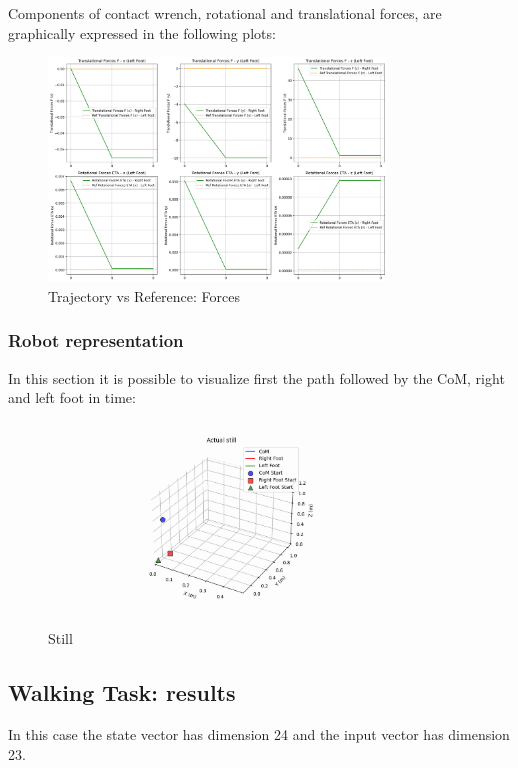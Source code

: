 \documentclass[main.tex]{subfiles}
\begin{document}
Components of contact wrench, rotational and translational forces, are graphically expressed in the following plots:
\begin{figure}[htbp]
    \centering
    \includegraphics[width=0.8\textwidth]{figures/contact_forces_still.png}
    \caption{Trajectory vs Reference: Forces}
    \label{fig:contact_forces_still}
\end{figure}

\newpage
\subsubsection{Robot representation}
In this section it is possible to visualize first the path followed by the CoM, right and left foot in time:
\begin{figure}[htbp]
    \centering
    \includegraphics[width=0.8\textwidth]{figures/still.PNG}
    \caption{Still}
    \label{fig:still}
\end{figure}


\subsection{Walking Task: results}
In this case the state vector has dimension 24 and the input vector has dimension 23.
\end{document}
